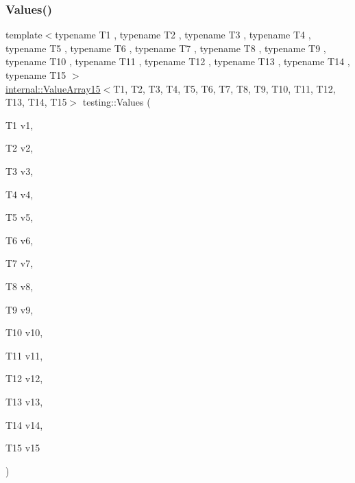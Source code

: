 \subsubsection{\texorpdfstring{Values()}{Values()}\hspace{0.1cm}{\footnotesize\ttfamily [15/50]}}
{\footnotesize\ttfamily template$<$typename T1 , typename T2 , typename T3 , typename T4 , typename T5 , typename T6 , typename T7 , typename T8 , typename T9 , typename T10 , typename T11 , typename T12 , typename T13 , typename T14 , typename T15 $>$ \\
\mbox{\hyperlink{classtesting_1_1internal_1_1ValueArray15}{internal\+::\+Value\+Array15}}$<$T1, T2, T3, T4, T5, T6, T7, T8, T9, T10, T11, T12, T13, T14, T15$>$ testing\+::\+Values (\begin{DoxyParamCaption}\item[{T1}]{v1,  }\item[{T2}]{v2,  }\item[{T3}]{v3,  }\item[{T4}]{v4,  }\item[{T5}]{v5,  }\item[{T6}]{v6,  }\item[{T7}]{v7,  }\item[{T8}]{v8,  }\item[{T9}]{v9,  }\item[{T10}]{v10,  }\item[{T11}]{v11,  }\item[{T12}]{v12,  }\item[{T13}]{v13,  }\item[{T14}]{v14,  }\item[{T15}]{v15 }\end{DoxyParamCaption})}

\mbox{\label{namespacetesting_afebcdc503d4a99cae5924523dcfd02e1}} 
